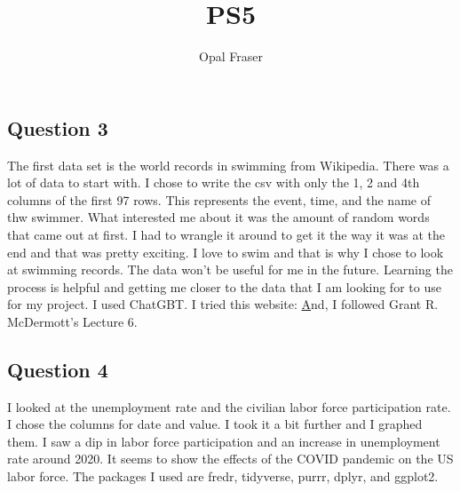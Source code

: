 \documentclass{article}
\title{PS5}
\author{Opal Fraser}
\begin{document}
\maketitle


\subsection{Question 3}
The first data set is the world records in swimming from Wikipedia. There was a lot of data to start with. I chose to write the csv with only the 1, 2 and 4th columns of the first 97 rows. This represents the event, time, and the name of thw swimmer. What interested me about it was the amount of random words that came out at first. I had to wrangle it around to get it the way it was at the end and that was pretty exciting. 
I love to swim and that is why I chose to look at swimming records. The data won't be useful for me in the future. Learning the process is helpful and getting me closer to the data that I am looking for to use for my project. 
I used ChatGBT. 
I tried this website:
\href{https://towardsdatascience.com/web-scraping-tutorial-in-r-5e71fd107f32}
And, I followed Grant R. McDermott's Lecture 6.
\subsection{Question 4}
I looked at the unemployment rate and the civilian labor force participation rate. I chose the columns for date and value. I took it a bit further and I graphed them. I saw a dip in labor force participation and an increase in unemployment rate around 2020. It seems to show the effects of the COVID pandemic on the US labor force. The packages I used are fredr, tidyverse, purrr, dplyr, and ggplot2. 
\end{document}
